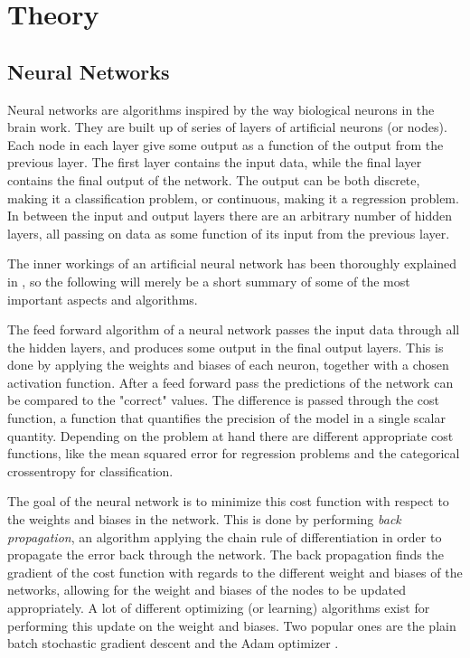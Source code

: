\documentclass[10pt, twocolumn]{article}
\begin{document}
\section{Theory}
\label{sec:Theory}
\subsection{Neural Networks}
Neural networks are algorithms inspired by the way biological neurons in the brain work. They are built up of series of layers of artificial neurons (or nodes). Each node in each layer give some output as a function of the output from the previous layer. The first layer contains the input data, while the final layer contains the final output of the network. The output can be both discrete, making it a classification problem, or continuous, making it a regression problem. In between the input and output layers there are an arbitrary number of hidden layers, all passing on data as some function of its input from the previous layer. 

The inner workings of an artificial neural network has been thoroughly explained in \cite{Project2}, so the following will merely be a short summary of some of the most important aspects and algorithms.

The feed forward algorithm of a neural network passes the input data through all the hidden layers, and produces some output in the final output layers. This is done by applying the weights and biases of each neuron, together with a chosen activation function. After a feed forward pass the predictions of the network can be compared to the "correct" values. The difference is passed through the cost function, a function that quantifies the precision of the model in a single scalar quantity. Depending on the problem at hand there are different appropriate cost functions, like the mean squared error for regression problems and the categorical crossentropy for classification.

The goal of the neural network is to minimize this cost function with respect to the weights and biases in the network. This is done by performing \textit{back propagation}, an algorithm applying the chain rule of differentiation in order to propagate the error back through the network. The back propagation finds the gradient of the cost function with regards to the different weight and biases of the networks, allowing for the weight and biases of the nodes to be updated appropriately. A lot of different optimizing (or learning) algorithms exist for performing this update on the weight and biases. Two popular ones are the plain batch stochastic gradient descent and the Adam optimizer \citep{adam}.
\end{document}
